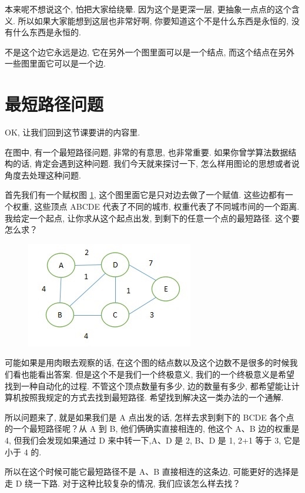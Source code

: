 本来呢不想说这个, 怕把大家给绕晕. 因为这个是更深一层, 更抽象一点点的这个含义. 所以如果大家能想到这层也非常好啊, 你要知道这个不是什么东西是永恒的, 没有什么东西是永恒的. 

不是这个边它永远是边, 它在另外一个图里面可以是一个结点, 而这个结点在另外一些图里面它可以是一个边. 

\section{最短路径问题}

OK, 让我们回到这节课要讲的内容里. 

在图中, 有一个最短路径问题, 非常的有意思, 也非常重要. 如果你曾学算法数据结构的话, 肯定会遇到这种问题. 我们今天就来探讨一下, 怎么样用图论的思想或者说角度去处理这种问题. 

首先我们有一个赋权图 \ref{fig:img26_2}, 这个图里面它是只对边去做了一个赋值. 这些边都有一个权重, 这些顶点 ABCDE 代表了不同的城市, 权重代表了不同城市间的一个距离. 我给定一个起点, 让你求从这个起点出发, 到剩下的任意一个点的最短路径. 这个要怎么求？

\begin{figure}[ht]
  \centering
  \includegraphics[width=0.5\linewidth]{asset/20230924051221.jpg}
  \caption{}
  \label{fig:img26_2}
\end{figure}

可能如果是用肉眼去观察的话, 在这个图的结点数以及这个边数不是很多的时候我们看也能看出答案. 但是这个不是我们一个终极意义, 我们的一个终极意义是希望找到一种自动化的过程. 不管这个顶点数量有多少, 边的数量有多少, 都希望能让计算机按照我规定的方式去找到最短路径. 希望找到解决这一类办法的一个通解. 

所以问题来了, 就是如果我们是 A 点出发的话, 怎样去求到剩下的 BCDE 各个点的一个最短路径呢？从 A 到 B, 他们俩确实直接相连的, 他这个 A、B 边的权重是 4, 但我们会发现如果通过 D 来中转一下,A、D 是 2, B、D 是 1,  2+1 等于 3, 它是小于 4 的. 

所以在这个时候可能它最短路径不是 A、B 直接相连的这条边, 可能更好的选择是走 D 绕一下路. 对于这种比较复杂的情况, 我们应该怎么样去找？


